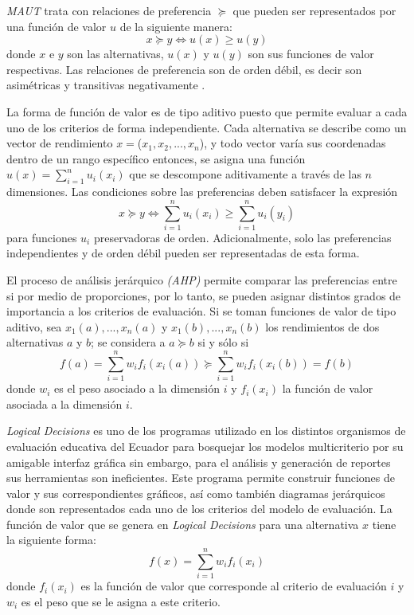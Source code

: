 \textit{MAUT} trata con relaciones de preferencia $\succeq$ que pueden ser representados por
una función de valor $u$ de la siguiente manera:
\[x\succeq y \Leftrightarrow u(x)\geq u(y)\]
donde $x$ e $y$ son las alternativas, $u(x)$ y $u(y)$ son sus funciones de valor respectivas. 
Las relaciones de preferencia son de orden débil, es decir son asimétricas y
transitivas negativamente \citep{3}.

La forma de función de valor es de tipo aditivo puesto que permite evaluar a cada uno de
los criterios de forma independiente. Cada alternativa se describe como un vector de rendimiento
$x=$($x_{1}, x_{2},..., x_{n}$), y todo vector varía sus coordenadas dentro de un rango específico
entonces, se asigna una función $u(x)=\sum\limits_{i=1}^{n}u_i(x_i)$ que se descompone aditivamente
a través de las $n$ dimensiones. Las condiciones sobre las preferencias deben satisfacer la
expresión
\[x\succeq y \Leftrightarrow \sum\limits_{i=1}^{n}u_i(x_i)\geq \sum\limits_{i=1}^{n}u_i(y_i)\]
para funciones $u_i$ preservadoras de orden\citep{3}. Adicionalmente, solo las
preferencias independientes y de orden débil pueden ser representadas de esta forma\citep{2}.

El proceso de análisis jerárquico \textit{(AHP)} permite comparar las preferencias entre si por
medio de proporciones, por lo tanto, se pueden asignar distintos grados de importancia a los
criterios de evaluación. Si se toman funciones de valor de tipo aditivo, sea $x_{1}(a),...,
x_{n}(a)$ y $x_{1}(b),..., x_{n}(b)$ los rendimientos de dos alternativas $a$ y $b$; se considera a
$a \succeq b$ si y sólo si
\[f(a)=\sum\limits_{i=1}^{n} w_i f_i(x_i(a))\succeq \sum\limits_{i=1}^{n}w_i f_i(x_i(b))=f(b)\]
donde $w_i$ es el peso asociado a la dimensión $i$ y $f_i(x_i)$ la función de valor asociada
a la dimensión $i$\citep{2}.   
   
{\it Logical Decisions\textregistered } es uno de los programas utilizado en los distintos
organismos de evaluación educativa del Ecuador para bosquejar los modelos multicriterio por su 
amigable interfaz gráfica sin embargo, para el análisis y generación de reportes sus herramientas
son ineficientes. Este programa permite construir funciones de valor y sus correspondientes
gráficos, así como también diagramas jerárquicos donde son representados cada uno de los criterios
del modelo de evaluación. La función de valor que se genera en {\it Logical Decisions\textregistered
} para una alternativa $x$ tiene la siguiente forma:
\[f(x)=\sum\limits_{i=1}^{n}w_i f_i(x_i)\]
donde $f_i(x_i)$ es la función de valor que corresponde al criterio de evaluación $i$ y $w_i$
es el peso que se le asigna a este criterio.
 
